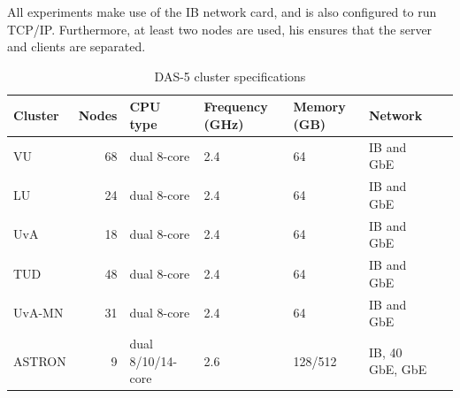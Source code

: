 All experiments make use of the IB network card, and is also configured to run TCP/IP.
Furthermore, at least two nodes are used, his ensures that the server and clients are separated.

\begin{table}
    \centering
    \begin{tabular}{lrlllll}
        \toprule
        \textbf{Cluster} & \textbf{Nodes} & \textbf{CPU type} & \textbf{Frequency (GHz)} & \textbf{Memory (GB)} & \textbf{Network} \\
        \midrule
        VU & 68 & dual 8-core & 2.4 & 64 & IB and GbE \\
        LU & 24 & dual 8-core & 2.4 & 64 & IB and GbE \\
        UvA & 18 & dual 8-core & 2.4 & 64 & IB and GbE \\
        TUD & 48 & dual 8-core & 2.4 & 64 & IB and GbE \\
        UvA-MN & 31 & dual 8-core & 2.4 & 64 & IB and GbE \\
        ASTRON & 9 & dual 8/10/14-core & 2.6 & 128/512 & IB, 40 GbE, GbE \\
        \bottomrule
    \end{tabular}
    \caption{DAS-5 cluster specifications}
    \label{tab:das5}
\end{table}






